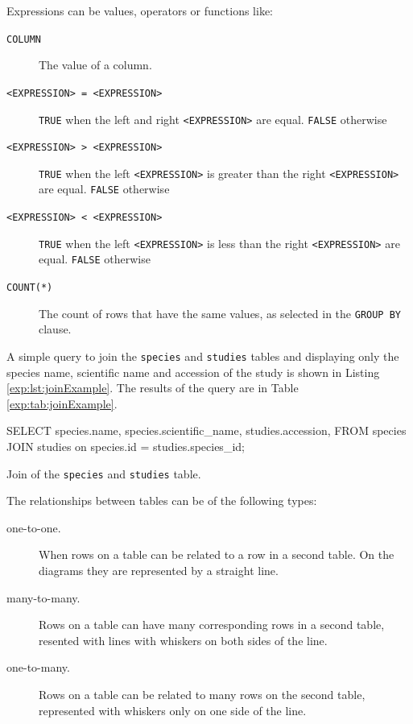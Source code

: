 Expressions can be values, operators or functions like:

\begin{description}
\item[\texttt{COLUMN}] The value of a column. 
\item[ \texttt{<EXPRESSION> = <EXPRESSION>}] \texttt{TRUE} when the left and right \texttt{<EXPRESSION>} are equal. \texttt{FALSE} otherwise 
\item[ \texttt{<EXPRESSION> > <EXPRESSION>}] \texttt{TRUE} when the left  \texttt{<EXPRESSION>} is greater than the  right \texttt{<EXPRESSION>} are equal. \texttt{FALSE} otherwise 
\item[ \texttt{<EXPRESSION> < <EXPRESSION>}] \texttt{TRUE} when the left  \texttt{<EXPRESSION>} is less than the  right \texttt{<EXPRESSION>} are equal. \texttt{FALSE} otherwise
\item[ \texttt{COUNT(*)}] The count of rows that have the same values, as selected in the \texttt{GROUP BY} clause.
\end{description}

A simple query to join the  \texttt{species} and \texttt{studies} tables and displaying only the species name, scientific name and accession of the study is shown in Listing \ref{exp:lst:joinExample}. 
The results of the query are in Table \ref{exp:tab:joinExample}. 

\begin{code}[language=sql, label=exp:lst:joinExample,caption=Join example query]
SELECT 
	species.name, 
	species.scientific_name, 
	studies.accession, 
FROM species
JOIN studies on species.id = studies.species_id;
\end{code}

\begin{table}[h!]

\caption[Join example]{Join of the \texttt{species} and \texttt{studies} table. }
\label{exp:tab:joinExample}
\centering

\end{table}


The relationships between tables can be of the following types:

\begin{description}
\item[one-to-one.] When rows on a table can be related to a row in a second table. On the diagrams they are represented by a straight line.
\item[many-to-many.] Rows on a table can have many corresponding rows in a second table, resented with lines with whiskers on both sides of the line.  
\item[one-to-many.] Rows on a table can be related to many rows on the second table, represented with whiskers only on one side of the line. 
\end{description}

